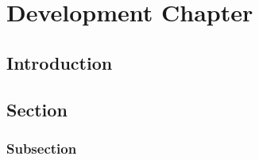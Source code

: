 \chapter{Development Chapter}

\section{Introduction}

\lipsum[1-4]

\section{Section}

\lipsum[2-4]

\subsection{Subsection}

\lipsum[2-4]